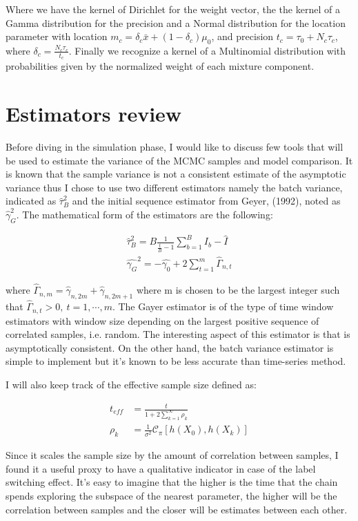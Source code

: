 \documentclass{article}
\begin{document}
Where we have the kernel of Dirichlet for the weight vector, the the kernel of a Gamma distribution for the precision and a Normal distribution for the location parameter with location \newline $m_c = \delta_c \bar{x} + (1-\delta_c) \mu_0$, and precision $t_c = \tau_0 + N_c \tau_c$, where $\delta_c = \frac{N_c\tau_c}{t_c}$. Finally we recognize a kernel of a Multinomial distribution with probabilities given by the normalized weight of each mixture component.

\section{Estimators review}
Before diving in the simulation phase, I would like to discuss few tools that will be used to estimate the variance of the MCMC samples and model comparison. It is known that the sample variance is not a consistent estimate of the asymptotic variance thus I chose to use two different estimators namely the batch variance, indicated as $\hat{\tau}_B^2$ and the initial sequence estimator from Geyer, (1992), noted as $\hat{\gamma}^2_G$. The mathematical form of the estimators are the following:

\begin{align*}
\hat{\tau}^2_B = B \frac{1}{\frac{t}{B} - 1} \sum_{b=1}^B I_b - \hat{I}  \\
\hat{\gamma_G}^2 = - \hat{\gamma_0} + 2 \sum_{t=1}^m \hat{\Gamma}_{n,t}
\end{align*}

where $\hat{\Gamma}_{n,m}=  \hat{\gamma}_{n,2m} + \hat{\gamma}_{n,2m+1}$ where m is chosen to be the largest integer such that $\hat{\Gamma}_{n,t}>0, \ t = 1, \cdots, m$. The Gayer estimator is of the type of time window estimators with window size depending on the largest positive sequence of correlated samples, i.e. random. The interesting aspect of this estimator is that is asymptotically consistent. On the other hand, the batch variance estimator is simple to implement but it's known to be less accurate than time-series method.

I will also keep track of the effective sample size defined as:

\begin{align*}
t_{eff} &= \frac{t}{1+2\sum_{k=1}^\infty \rho_k} \\
\rho_k & =  \frac{1}{\sigma^2}\mathcal{C}_\pi [h(X_0), h(X_k)]
\end{align*}

Since it scales the sample size by the amount of correlation between samples, I found it a useful proxy to have a qualitative indicator in case of the label switching effect. It's easy to imagine that the higher is the time that the chain spends exploring the subspace of the nearest parameter, the higher will be the correlation between samples and the closer will be estimates between each other.
\end{document}

